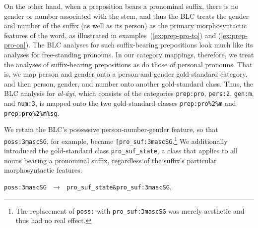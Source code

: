 {\begin{description}
On the other hand, when a preposition bears a pronominal suffix, there is no gender 
or number associated with the stem, and thus the BLC treats the gender and 
number of the suffix (as well as its person) 
as the primary morphosyntactic features of the word, as illustrated in 
examples~(\ref{ex:prep-pro-to}) 
and (\ref{ex:prep-pro-on}). The BLC analyses for such suffix-bearing 
prepositions look much 
like its analyses for free-standing pronouns. 
In our category mappings, therefore, we treat the analyses of suffix-bearing 
prepositions as do those 
of personal pronouns. That is, we map person and gender onto a person-and-gender gold-standard
category, and then person, gender, and number onto another gold-standard class.
Thus, the BLC analysis for \textit{al-\'{a}yi}, 
which consists of the categories \texttt{prep:pro}, \texttt{pers:2}, \texttt{gen:m}, and \texttt{num:3}, 
is mapped onto the two gold-standard classes \texttt{prep:pro\%2\%m} and 
\texttt{prep:pro\%2\%m\%sg}.

We retain the BLC's possessive person-number-gender feature, so that \texttt{poss:3mascSG},
for example, became \texttt{[pro\_suf:3mascSG}.\footnote{The replacement of \texttt{poss:} with 
\texttt{pro\_suf:3mascSG} was merely aesthetic and thus had no real effect.}
We additionally introduced the gold-standard class \texttt{pro\_suf\_state}, a class that applies to
all nouns bearing a pronominal suffix, regardless of the suffix's particular
morphosyntactic features. 
\begin{exe}
\ex \label{ex:mapping-pron-suf}
\texttt{poss:3mascSG}  $\,\,\to\,\,$ \texttt{pro\_suf\_state\&pro\_suf:3mascSG}, 
\end{exe}

%
%




\end{description}}
